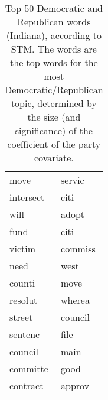 \begin{table}[ht]
\begin{tabular}{ll}
  move & servic \\ 
  intersect & citi \\ 
  will & adopt \\ 
  fund & citi \\ 
  victim & commiss \\ 
  need & west \\ 
  counti & move \\ 
  resolut & wherea \\ 
  street & council \\ 
  sentenc & file \\ 
  council & main \\ 
  committe & good \\ 
  contract & approv \\ 
   \hline
\end{tabular}
\endgroup
\caption{Top 50 Democratic and Republican words (Indiana), according to STM. 
             The words are the top words for the most Democratic/Republican topic, determined
             by the size (and significance) of the coefficient of the party covariate.} 
\label{tabSTMIN}
\end{table}

